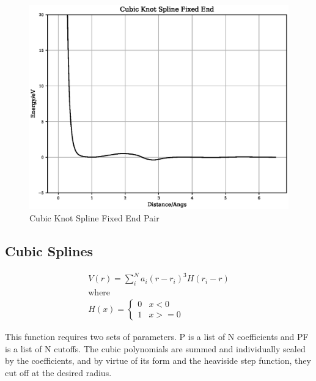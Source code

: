 \documentclass[12pt,twoside]{manual}
\begin{document}
\begin{appendices}
\FloatBarrier
\begin{figure}[h]
  \begin{center}
    \includegraphics[scale=0.5]{img/plots/cubic_knot_spline_fixed_end_pair.eps}
    \caption{Cubic Knot Spline Fixed End Pair}
    \label{graph:graph1}
  \end{center}
\end{figure}
\FloatBarrier






\subsection{Cubic Splines}

\begin{equation}
\begin{split}
V(r) = \sum_i^N a_i (r - r_i)^3 H(r_i - r) \\
\text{where } \\
H(x) = \left\{ \begin{matrix} 0 & x<0 \\  1 & x >= 0 \end{matrix} \right . 
\end{split}
\label{eq:cubicSpline}
\end{equation}

This function requires two sets of parameters.  P is a list of N coefficients and PF is a list of N cutoffs.  The cubic polynomials are summed and individually scaled by the coefficients, and by virtue of its form and the heaviside step function, they cut off at the desired radius. 


\end{appendices}
\end{document}
